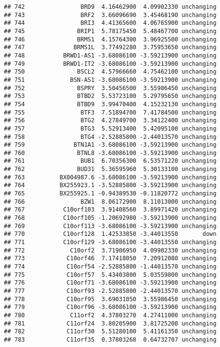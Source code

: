 \documentclass[]{article}
\begin{document}
\begin{verbatim}
## 742                BRD9  4.16462900  4.09902330 unchanging
## 743                BRF2  3.66096690  3.45468190 unchanging
## 744                BRI3  4.41365600  4.06765900 unchanging
## 745               BRIP1  5.78175450  5.48467700 unchanging
## 746               BRMS1  4.15764300  3.96925500 unchanging
## 747              BRMS1L  3.77492280  3.75953650 unchanging
## 748           BRWD1-AS1 -3.68086100 -3.59213900 unchanging
## 749           BRWD1-IT2 -3.68086100 -3.59213900 unchanging
## 750               BSCL2  4.57966660  4.75462100 unchanging
## 751             BSN-AS1 -3.68086100 -3.59213900 unchanging
## 752               BSPRY  3.50456500  3.55986450 unchanging
## 753               BTBD2  5.53723100  5.29795650 unchanging
## 754               BTBD9  3.99470400  4.15232130 unchanging
## 755                BTF3  7.51894700  7.41784500 unchanging
## 756                BTG2  4.27849700  3.34122400 unchanging
## 757                BTG3  5.52913400  5.42095100 unchanging
## 758                BTG4 -2.52885800 -2.44013570 unchanging
## 759              BTN1A1 -3.68086100 -3.59213900 unchanging
## 760               BTNL8 -3.68086100 -3.59213900 unchanging
## 761                BUB1  6.70356300  6.53571220 unchanging
## 762               BUD31  5.36595960  5.30133100 unchanging
## 763          BX004987.6 -3.68086100 -3.59213900 unchanging
## 764          BX255923.1 -3.52885800 -3.59213900 unchanging
## 765          BX255925.1 -0.94389530 -0.11820772 unchanging
## 766                BZW1  8.06172900  8.11013000 unchanging
## 767           C10orf103  3.91408560  3.89971420 unchanging
## 768           C10orf105 -1.20692980 -3.59213900 unchanging
## 769           C10orf113 -3.68086100 -3.59213900 unchanging
## 770           C10orf128  1.42533850 -3.44013550       down
## 771           C10orf129 -3.68086100 -3.44013550 unchanging
## 772             C10orf2  3.71906950  4.09902330 unchanging
## 773            C10orf46  7.17418050  7.20912080 unchanging
## 774            C10orf54 -2.52885800 -1.44013570 unchanging
## 775            C10orf57  5.43403800  5.03559800 unchanging
## 776            C10orf71 -3.68086100 -3.59213900 unchanging
## 777            C10orf93 -2.52885800 -2.44013570 unchanging
## 778            C10orf95  3.69031050  3.55986450 unchanging
## 779            C10orf96 -3.68086100 -3.59213900 unchanging
## 780             C11orf2  4.37803270  4.27411000 unchanging
## 781            C11orf24  3.80205900  3.81725200 unchanging
## 782            C11orf30  5.51280100  5.41161350 unchanging
## 783            C11orf35  0.37803268  0.64732707 unchanging

\end{verbatim}
\end{document}
